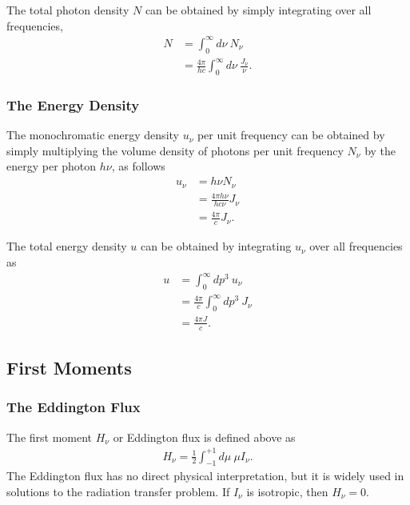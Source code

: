 The total photon density $N$ can be obtained by simply integrating over all frequencies, 
\begin{align}
N &= \int_0^\infty\!\!\!d\nu\: N_\nu\\
&= \frac{4\pi}{hc} \int_0^\infty\!\!\!d\nu\: \frac{J_\nu}{\nu}.
\end{align}

\newslide

\subsubsection{The Energy Density}

The monochromatic energy density $u_\nu$ per unit frequency can be obtained by simply multiplying the volume density of photons per unit frequency $N_\nu$ by the energy per photon $h\nu$, as follows
\begin{align}
u_\nu &= h\nu N_\nu\\
&= \frac{4\pi h\nu}{hc\nu} J_\nu\\
&= \frac{4\pi}{c}J_\nu.
\end{align}

The total energy density $u$ can be obtained by
  integrating $u_\nu$ over all frequencies as
\begin{align}
u &= \int_0^\infty\!\!\!dp^3\:u_\nu\\
&= \frac{4\pi}{c}  \int_0^\infty\!\!\!dp^3\: J_\nu\\
&= \frac{4\pi J}{c}.
\end{align}

\newslide

\subsection{First Moments}

\newslide

\subsubsection{The Eddington Flux}

The first moment $H_\nu$ or Eddington flux is defined above as
\begin{align}
H_\nu = \frac{1}{2} \int_{-1}^{+1}\!\!\!d\mu\:\mu I_\nu.
\end{align}
The Eddington flux has no direct physical interpretation, but it is
widely used in solutions to the radiation transfer problem. If $I_\nu$
is isotropic, then $H_\nu = 0$.

